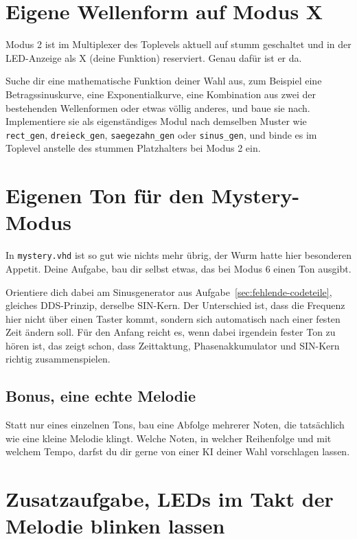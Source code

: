 \section{Eigene Wellenform auf Modus X}

Modus 2 ist im Multiplexer des Toplevels aktuell auf stumm geschaltet und in der LED-Anzeige als \glqq X (deine Funktion)\grqq{} reserviert. Genau dafür ist er da.

Suche dir eine mathematische Funktion deiner Wahl aus, zum Beispiel eine Betragssinuskurve, eine Exponentialkurve, eine Kombination aus zwei der bestehenden Wellenformen oder etwas völlig anderes, und baue sie nach. Implementiere sie als eigenständiges Modul nach demselben Muster wie \texttt{rect\_gen}, \texttt{dreieck\_gen}, \texttt{saegezahn\_gen} oder \texttt{sinus\_gen}, und binde es im Toplevel anstelle des stummen Platzhalters bei Modus 2 ein.

\section{Eigenen Ton für den Mystery-Modus}
\label{sec:mystery-melodie}

In \texttt{mystery.vhd} ist so gut wie nichts mehr übrig, der Wurm hatte hier besonderen Appetit. Deine Aufgabe, bau dir selbst etwas, das bei Modus 6 einen Ton ausgibt.

Orientiere dich dabei am Sinusgenerator aus Aufgabe~\ref{sec:fehlende-codeteile}, gleiches DDS-Prinzip, derselbe SIN-Kern. Der Unterschied ist, dass die Frequenz hier nicht über einen Taster kommt, sondern sich automatisch nach einer festen Zeit ändern soll. Für den Anfang reicht es, wenn dabei irgendein fester Ton zu hören ist, das zeigt schon, dass Zeittaktung, Phasenakkumulator und SIN-Kern richtig zusammenspielen.

\subsection*{Bonus, eine echte Melodie}

Statt nur eines einzelnen Tons, bau eine Abfolge mehrerer Noten, die tatsächlich wie eine kleine Melodie klingt. Welche Noten, in welcher Reihenfolge und mit welchem Tempo, darfst du dir gerne von einer KI deiner Wahl vorschlagen lassen.

\section{Zusatzaufgabe, LEDs im Takt der Melodie blinken lassen}

